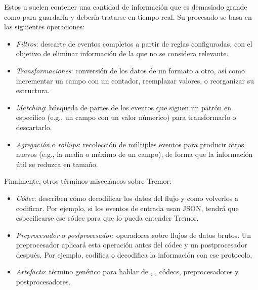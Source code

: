 Estos \onramps u \offramps suelen contener una cantidad de información que es
demasiado grande como para guardarla y debería tratarse en tiempo real. Su
procesado se basa en las siguientes operaciones:

\begin{itemize}
    \item \emph{Filtros}: descarte de eventos completos a partir de reglas
        configuradas, con el objetivo de eliminar información de la \pipeline
        que no se considera relevante.

    \item \emph{Transformaciones}: conversión de los datos de un formato a otro,
        así como incrementar un campo con un contador, reemplazar valores, o
        reorganizar su estructura.

    \item \emph{Matching}: búsqueda de partes de los eventos que siguen un
        patrón en específico (e.g., un campo  con un valor númerico)
        para transformarlo o descartarlo.

    \item \emph{Agregación} o \emph{rollups}: recolección de múltiples eventos
        para producir otros nuevos (e.g., la media o máximo de un campo), de
        forma que la información útil se reduzca en tamaño.

\end{itemize}

Finalmente, otros términos misceláneos sobre Tremor:

\begin{itemize}
    \item \emph{Códec}: describen cómo decodificar los datos del flujo y como
        volverlos a codificar. Por ejemplo, si los eventos de entrada usan JSON,
        tendrá que especificarse ese códec para que lo pueda entender Tremor.

    \item \emph{Preprocesador} o \emph{postprocesador}: operadores sobre flujos
        de datos brutos. Un preprocesador aplicará esta operación antes del
        códec y un postprocesador después. Por ejemplo,  codifica o
        decodifica la información con ese protocolo.

    \item \emph{Artefacto}: término genérico para hablar de \sinks, \sources,
        códecs, preprocesadores y postprocesadores.

\end{itemize}

